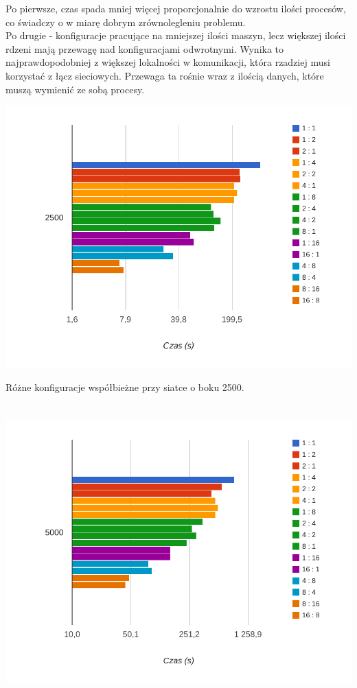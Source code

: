 \documentclass[paper=a4, fontsize=11pt]{scrartcl}	%
\numberwithin{equation}{section}		%
\numberwithin{figure}{section}			%
\numberwithin{table}{section}				%
\begin{document}
Po pierwsze, czas spada mniej więcej proporcjonalnie do wzrostu ilości procesów,
co świadczy o w miarę dobrym zrównolegleniu problemu. \\

Po drugie - konfiguracje
pracujące na mniejszej ilości maszyn, lecz większej ilości rdzeni mają przewagę
nad konfiguracjami odwrotnymi. Wynika to najprawdopodobniej z większej
lokalności w komunikacji, która rzadziej musi korzystać z łącz sieciowych.
Przewaga ta rośnie wraz z ilością danych, które muszą wymienić ze sobą procesy.
\\

\begin{center}

\includegraphics[width=135mm]{report/time-2500.pdf}

Różne konfiguracje współbieżne przy siatce o boku 2500.
\\ \ \\ \ \\


\includegraphics[width=135mm]{report/time-5000.pdf}


\end{center}
\end{document}
